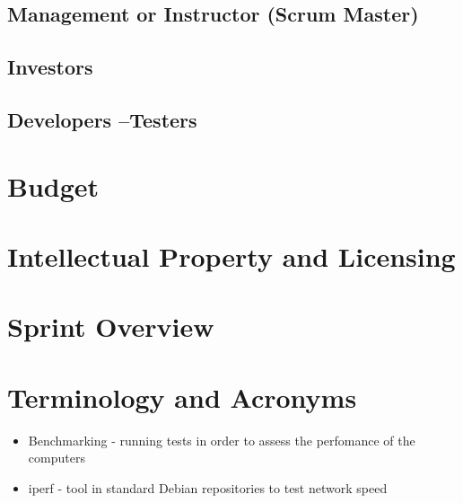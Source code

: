 \subsection{Management or Instructor (Scrum Master)}

\subsection{Investors}


\subsection{Developers --Testers}

\section{Budget}

\section{Intellectual Property and Licensing}

\section{Sprint  Overview}


\section{Terminology and Acronyms}
\begin{itemize}
	\item Benchmarking - running tests in order to assess the perfomance of the computers
	\item iperf - tool in standard Debian repositories to test network speed
\end{itemize}


